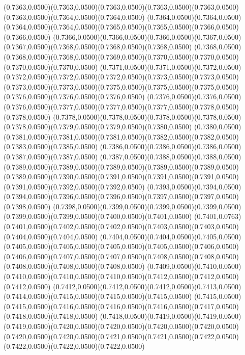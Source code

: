 (0.7363,0.0500)(0.7363,0.0500)(0.7363,0.0500)(0.7363,0.0500)(0.7363,0.0500)(0.7363,0.0500)(0.7364,0.0500)(0.7364,0.0500)
(0.7364,0.0500)(0.7364,0.0500)(0.7364,0.0500)(0.7364,0.0500)(0.7365,0.0500)(0.7365,0.0500)(0.7366,0.0500)(0.7366,0.0500)
(0.7366,0.0500)(0.7366,0.0500)(0.7366,0.0500)(0.7367,0.0500)(0.7367,0.0500)(0.7368,0.0500)(0.7368,0.0500)(0.7368,0.0500)
(0.7368,0.0500)(0.7368,0.0500)(0.7368,0.0500)(0.7369,0.0500)(0.7370,0.0500)(0.7370,0.0500)(0.7370,0.0500)(0.7370,0.0500)
(0.7371,0.0500)(0.7371,0.0500)(0.7372,0.0500)(0.7372,0.0500)(0.7372,0.0500)(0.7372,0.0500)(0.7373,0.0500)(0.7373,0.0500)
(0.7373,0.0500)(0.7373,0.0500)(0.7375,0.0500)(0.7375,0.0500)(0.7375,0.0500)(0.7376,0.0500)(0.7376,0.0500)(0.7376,0.0500)
(0.7376,0.0500)(0.7376,0.0500)(0.7376,0.0500)(0.7377,0.0500)(0.7377,0.0500)(0.7377,0.0500)(0.7378,0.0500)(0.7378,0.0500)
(0.7378,0.0500)(0.7378,0.0500)(0.7378,0.0500)(0.7378,0.0500)(0.7378,0.0500)(0.7379,0.0500)(0.7379,0.0500)(0.7380,0.0500)
(0.7380,0.0500)(0.7381,0.0500)(0.7381,0.0500)(0.7381,0.0500)(0.7382,0.0500)(0.7382,0.0500)(0.7383,0.0500)(0.7385,0.0500)
(0.7386,0.0500)(0.7386,0.0500)(0.7386,0.0500)(0.7387,0.0500)(0.7387,0.0500)
\PST@Solid(0.7387,0.0500)(0.7388,0.0500)(0.7388,0.0500)(0.7389,0.0500)(0.7389,0.0500)(0.7389,0.0500)(0.7389,0.0500)(0.7389,0.0500)
(0.7389,0.0500)(0.7390,0.0500)(0.7391,0.0500)(0.7391,0.0500)(0.7391,0.0500)(0.7391,0.0500)(0.7392,0.0500)(0.7392,0.0500)
(0.7393,0.0500)(0.7394,0.0500)(0.7394,0.0500)(0.7396,0.0500)(0.7396,0.0500)(0.7397,0.0500)(0.7397,0.0500)(0.7398,0.0500)
(0.7398,0.0500)(0.7399,0.0500)(0.7399,0.0500)(0.7399,0.0500)(0.7399,0.0500)(0.7399,0.0500)(0.7400,0.0500)(0.7401,0.0500)
(0.7401,0.0763)(0.7401,0.0500)(0.7402,0.0500)(0.7402,0.0500)(0.7403,0.0500)(0.7403,0.0500)(0.7404,0.0500)(0.7404,0.0500)
(0.7404,0.0500)(0.7404,0.0500)(0.7405,0.0500)(0.7405,0.0500)(0.7405,0.0500)(0.7405,0.0500)(0.7405,0.0500)(0.7406,0.0500)
(0.7406,0.0500)(0.7407,0.0500)(0.7407,0.0500)(0.7408,0.0500)(0.7408,0.0500)(0.7408,0.0500)(0.7408,0.0500)(0.7408,0.0500)
(0.7409,0.0500)(0.7410,0.0500)(0.7410,0.0500)(0.7410,0.0500)(0.7410,0.0500)(0.7412,0.0500)(0.7412,0.0500)(0.7412,0.0500)
(0.7412,0.0500)(0.7412,0.0500)(0.7412,0.0500)(0.7413,0.0500)(0.7414,0.0500)(0.7415,0.0500)(0.7415,0.0500)(0.7415,0.0500)
(0.7415,0.0500)(0.7415,0.0500)(0.7416,0.0500)(0.7416,0.0500)(0.7416,0.0500)(0.7417,0.0500)(0.7418,0.0500)(0.7418,0.0500)
(0.7418,0.0500)(0.7419,0.0500)(0.7419,0.0500)(0.7419,0.0500)(0.7420,0.0500)(0.7420,0.0500)(0.7420,0.0500)(0.7420,0.0500)
(0.7420,0.0500)(0.7420,0.0500)(0.7421,0.0500)(0.7421,0.0500)(0.7422,0.0500)(0.7422,0.0500)(0.7422,0.0500)(0.7422,0.0500)
